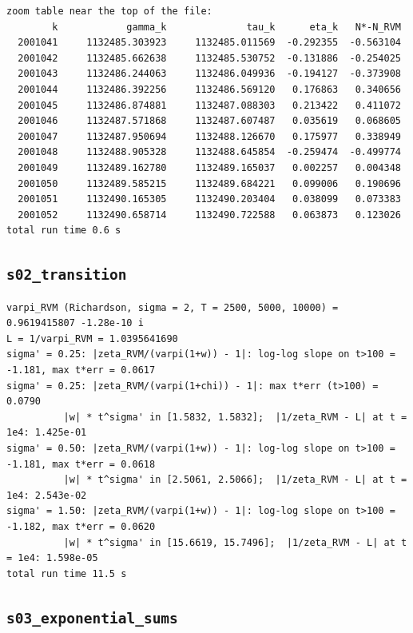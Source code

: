 \documentclass[11pt,reqno]{amsart}
\numberwithin{equation}{section}
\theoremstyle{plain}
\theoremstyle{definition}
\theoremstyle{remark}
\begin{document}
\begin{lstlisting}[style=out]
zoom table near the top of the file:
        k            gamma_k              tau_k      eta_k   N*-N_RVM
  2001041     1132485.303923     1132485.011569  -0.292355  -0.563104
  2001042     1132485.662638     1132485.530752  -0.131886  -0.254025
  2001043     1132486.244063     1132486.049936  -0.194127  -0.373908
  2001044     1132486.392256     1132486.569120   0.176863   0.340656
  2001045     1132486.874881     1132487.088303   0.213422   0.411072
  2001046     1132487.571868     1132487.607487   0.035619   0.068605
  2001047     1132487.950694     1132488.126670   0.175977   0.338949
  2001048     1132488.905328     1132488.645854  -0.259474  -0.499774
  2001049     1132489.162780     1132489.165037   0.002257   0.004348
  2001050     1132489.585215     1132489.684221   0.099006   0.190696
  2001051     1132490.165305     1132490.203404   0.038099   0.073383
  2001052     1132490.658714     1132490.722588   0.063873   0.123026
total run time 0.6 s
\end{lstlisting}

\subsection{\texttt{s02\_transition}}
\label{app:out-s02-transition}

\begin{lstlisting}[style=out]
varpi_RVM (Richardson, sigma = 2, T = 2500, 5000, 10000) = 0.9619415807 -1.28e-10 i
L = 1/varpi_RVM = 1.0395641690
sigma' = 0.25: |zeta_RVM/(varpi(1+w)) - 1|: log-log slope on t>100 = -1.181, max t*err = 0.0617
sigma' = 0.25: |zeta_RVM/(varpi(1+chi)) - 1|: max t*err (t>100) = 0.0790
          |w| * t^sigma' in [1.5832, 1.5832];  |1/zeta_RVM - L| at t = 1e4: 1.425e-01
sigma' = 0.50: |zeta_RVM/(varpi(1+w)) - 1|: log-log slope on t>100 = -1.181, max t*err = 0.0618
          |w| * t^sigma' in [2.5061, 2.5066];  |1/zeta_RVM - L| at t = 1e4: 2.543e-02
sigma' = 1.50: |zeta_RVM/(varpi(1+w)) - 1|: log-log slope on t>100 = -1.182, max t*err = 0.0620
          |w| * t^sigma' in [15.6619, 15.7496];  |1/zeta_RVM - L| at t = 1e4: 1.598e-05
total run time 11.5 s
\end{lstlisting}

\subsection{\texttt{s03\_exponential\_sums}}
\label{app:out-s03-exponential-sums}
\end{document}
